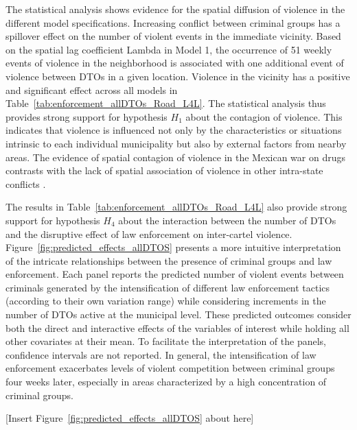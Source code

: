 \documentclass[12pt,letterpaper]{article}
\begin{document}
The statistical analysis shows evidence for the spatial diffusion of violence in the different model specifications. Increasing conflict between criminal groups has a spillover effect on the number of violent events in the immediate vicinity. Based on the spatial lag coefficient Lambda in Model 1, the occurrence of 51 weekly events of violence in the neighborhood is associated with one additional event of violence between DTOs in a given location. Violence in the vicinity has a positive and significant effect across all models in Table~\ref{tab:enforcement_allDTOs_Road_L4L}. The statistical analysis thus provides strong support for hypothesis $H_{1}$ about the contagion of violence. This indicates that violence is influenced not only by the characteristics or situations intrinsic to each individual municipality but also by external factors from nearby areas. The evidence of spatial contagion of violence in the Mexican war on drugs contrasts with the lack of spatial association of violence in other intra-state conflicts \citep{Hegre2001}. 

The results in Table~\ref{tab:enforcement_allDTOs_Road_L4L} also provide strong support for hypothesis  $H_{4}$ about the interaction between the number of DTOs and the disruptive effect of law enforcement on inter-cartel violence. Figure~\ref{fig:predicted_effects_allDTOS} presents a more intuitive interpretation of the intricate relationships between the presence of criminal groups and law enforcement. Each panel reports the predicted number of violent events between criminals generated by the intensification of different law enforcement tactics (according to their own variation range) while considering increments in the number of DTOs active at the municipal level. These predicted outcomes consider both the direct and interactive effects of the variables of interest while holding all other covariates at their mean. To facilitate the interpretation of the panels, confidence intervals are not reported. In general, the intensification of law enforcement exacerbates levels of violent competition between criminal groups four weeks later, especially in areas characterized by a high concentration of criminal groups. 

\begin{center}
   [Insert Figure~\ref{fig:predicted_effects_allDTOS} about here]
\end{center}
\end{document}
